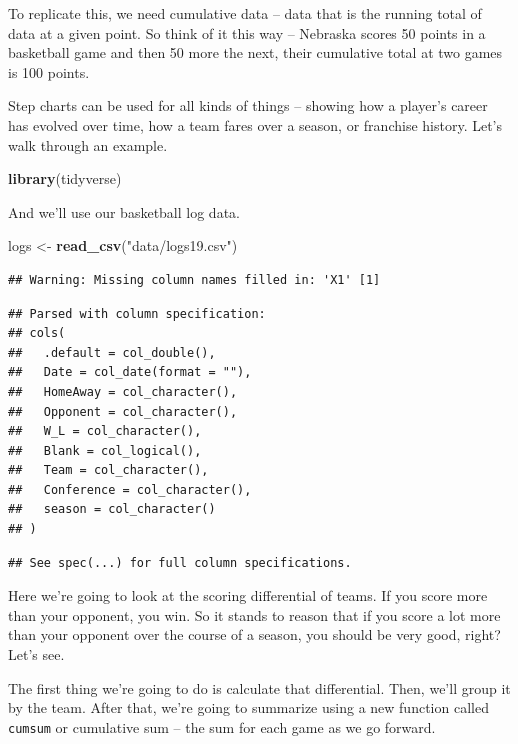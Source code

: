 \documentclass[]{book}
\newenvironment{Shaded}{\begin{snugshade}}{\end{snugshade}}
\newcommand{\KeywordTok}[1]{\textcolor[rgb]{0.13,0.29,0.53}{\textbf{#1}}}
\newcommand{\StringTok}[1]{\textcolor[rgb]{0.31,0.60,0.02}{#1}}
\newcommand{\NormalTok}[1]{#1}
\begin{document}
To replicate this, we need cumulative data -- data that is the running
total of data at a given point. So think of it this way -- Nebraska
scores 50 points in a basketball game and then 50 more the next, their
cumulative total at two games is 100 points.

Step charts can be used for all kinds of things -- showing how a
player's career has evolved over time, how a team fares over a season,
or franchise history. Let's walk through an example.

\begin{Shaded}
\begin{Highlighting}[]
\KeywordTok{library}\NormalTok{(tidyverse)}
\end{Highlighting}
\end{Shaded}

And we'll use our basketball log data.

\begin{Shaded}
\begin{Highlighting}[]
\NormalTok{logs <-}\StringTok{ }\KeywordTok{read_csv}\NormalTok{(}\StringTok{"data/logs19.csv"}\NormalTok{)}
\end{Highlighting}
\end{Shaded}

\begin{verbatim}
## Warning: Missing column names filled in: 'X1' [1]
\end{verbatim}

\begin{verbatim}
## Parsed with column specification:
## cols(
##   .default = col_double(),
##   Date = col_date(format = ""),
##   HomeAway = col_character(),
##   Opponent = col_character(),
##   W_L = col_character(),
##   Blank = col_logical(),
##   Team = col_character(),
##   Conference = col_character(),
##   season = col_character()
## )
\end{verbatim}

\begin{verbatim}
## See spec(...) for full column specifications.
\end{verbatim}

Here we're going to look at the scoring differential of teams. If you
score more than your opponent, you win. So it stands to reason that if
you score a lot more than your opponent over the course of a season, you
should be very good, right? Let's see.

The first thing we're going to do is calculate that differential. Then,
we'll group it by the team. After that, we're going to summarize using a
new function called \texttt{cumsum} or cumulative sum -- the sum for
each game as we go forward.
\end{document}
